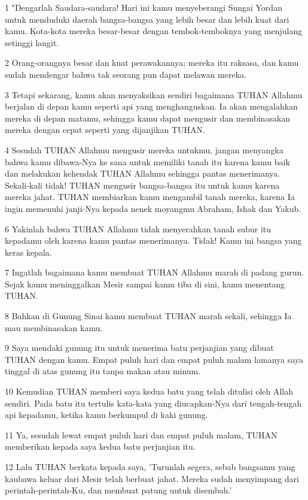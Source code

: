 \par 1 "Dengarlah Saudara-saudara! Hari ini kamu menyeberangi Sungai Yordan untuk menduduki daerah bangsa-bangsa yang lebih besar dan lebih kuat dari kamu. Kota-kota mereka besar-besar dengan tembok-temboknya yang menjulang setinggi langit.
\par 2 Orang-orangnya besar dan kuat perawakannya; mereka itu raksasa, dan kamu sudah mendengar bahwa tak seorang pun dapat melawan mereka.
\par 3 Tetapi sekarang, kamu akan menyaksikan sendiri bagaimana TUHAN Allahmu berjalan di depan kamu seperti api yang menghanguskan. Ia akan mengalahkan mereka di depan matamu, sehingga kamu dapat mengusir dan membinasakan mereka dengan cepat seperti yang dijanjikan TUHAN.
\par 4 Sesudah TUHAN Allahmu mengusir mereka untukmu, jangan menyangka bahwa kamu dibawa-Nya ke sana untuk memiliki tanah itu karena kamu baik dan melakukan kehendak TUHAN Allahmu sehingga pantas menerimanya. Sekali-kali tidak! TUHAN mengusir bangsa-bangsa itu untuk kamu karena mereka jahat. TUHAN membiarkan kamu mengambil tanah mereka, karena Ia ingin memenuhi janji-Nya kepada nenek moyangmu Abraham, Ishak dan Yakub.
\par 6 Yakinlah bahwa TUHAN Allahmu tidak menyerahkan tanah subur itu kepadamu oleh karena kamu pantas menerimanya. Tidak! Kamu ini bangsa yang keras kepala.
\par 7 Ingatlah bagaimana kamu membuat TUHAN Allahmu marah di padang gurun. Sejak kamu meninggalkan Mesir sampai kamu tiba di sini, kamu menentang TUHAN.
\par 8 Bahkan di Gunung Sinai kamu membuat TUHAN marah sekali, sehingga Ia mau membinasakan kamu.
\par 9 Saya mendaki gunung itu untuk menerima batu perjanjian yang dibuat TUHAN dengan kamu. Empat puluh hari dan empat puluh malam lamanya saya tinggal di atas gunung itu tanpa makan atau minum.
\par 10 Kemudian TUHAN memberi saya kedua batu yang telah ditulisi oleh Allah sendiri. Pada batu itu tertulis kata-kata yang diucapkan-Nya dari tengah-tengah api kepadamu, ketika kamu berkumpul di kaki gunung.
\par 11 Ya, sesudah lewat empat puluh hari dan empat puluh malam, TUHAN memberikan kepada saya kedua batu perjanjian itu.
\par 12 Lalu TUHAN berkata kepada saya, 'Turunlah segera, sebab bangsamu yang kaubawa keluar dari Mesir telah berbuat jahat. Mereka sudah menyimpang dari perintah-perintah-Ku, dan membuat patung untuk disembah.'
